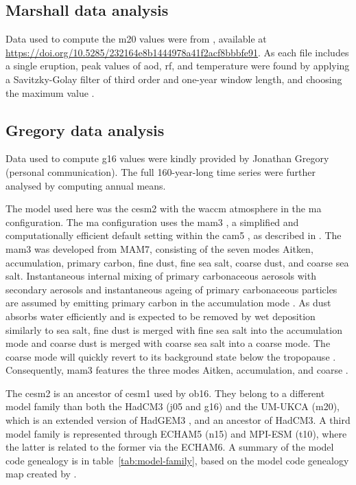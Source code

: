 \documentclass{ametsocV6.1}
\begin{document}
\subsection{Marshall data analysis}\label{ap:m20}

Data used to compute the \gls{m20} values were from \citet{marshall2020dataset},
available at \url{https://doi.org/10.5285/232164e8b1444978a41f2acf8bbbfe91}. As each
file includes a single eruption, peak values of \gls{aod}, \gls{rf}, and temperature
were found by applying a Savitzky-Golay filter of third order and one-year window
length, and choosing the maximum value \citep{savitzky1964}.

\subsection{Gregory data analysis}\label{ap:g16}

Data used to compute \gls{g16} values were kindly provided by Jonathan Gregory (personal
communication). The full 160-year-long time series were further analysed by computing
annual means.

\appendix[C]


The model used here was the \gls{cesm2} with the \gls{waccm} atmosphere in the \gls{ma}
configuration. The \gls{ma} configuration uses the \gls{mam3} \citep{gettleman2019}, a
simplified and computationally efficient default setting within the \gls{cam5}
\citep{liu2016}, as described in \citet{liu2012}. The \gls{mam3} was developed from
MAM7, consisting of the seven modes Aitken, accumulation, primary carbon, fine dust,
fine sea salt, coarse dust, and coarse sea salt. Instantaneous internal mixing of
primary carbonaceous aerosols with secondary aerosols and instantaneous ageing of
primary carbonaceous particles are assumed by emitting primary carbon in the
accumulation mode \citep{liu2016}. As dust absorbs water efficiently and is expected to
be removed by wet deposition similarly to sea salt, fine dust is merged with fine sea
salt into the accumulation mode and coarse dust is merged with coarse sea salt into a
coarse mode. The coarse mode will quickly revert to its background state below the
tropopause \citep{liu2012}. Consequently, \gls{mam3} features the three modes Aitken,
accumulation, and coarse \citep{liu2016}.

The \gls{cesm2} is an ancestor of \gls{cesm1} used by \gls{ob16}. They belong to a
different model family than both the HadCM3 (\gls{j05} and \gls{g16}) and the UM-UKCA
(\gls{m20}), which is an extended version of HadGEM3 \citep{dhomse2014}, and an ancestor
of HadCM3. A third model family is represented through ECHAM5 (\gls{n15}) and MPI-ESM
(\gls{t10}), where the latter is related to the former via the ECHAM6. A summary of the
model code genealogy is in table~\ref{tab:model-family}, based on the model code
genealogy map created by \citet{kuma2023}.
\end{document}
